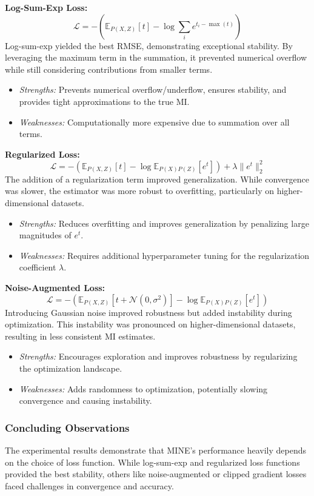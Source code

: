 \documentclass[lettersize,journal]{IEEEtran}
\begin{document}
    \textbf{Log-Sum-Exp Loss:} 
  $$\mathcal{L} = - \left( \mathbb{E}_{P(X, Z)}[t] - \log \sum_{i} e^{t_i - \max(t)} \right)$$
  Log-sum-exp yielded the best RMSE, demonstrating exceptional stability. By leveraging the maximum term in the summation, it prevented numerical overflow while still considering contributions from smaller terms.
    \begin{itemize}
        \item \textit{Strengths:} Prevents numerical overflow/underflow, ensures stability, and provides tight approximations to the true MI.
        \item \textit{Weaknesses:} Computationally more expensive due to summation over all terms.
    \end{itemize}
    
    \textbf{Regularized Loss:} 
  $$\mathcal{L} = - \left( \mathbb{E}_{P(X, Z)}[t] - \log \mathbb{E}_{P(X)P(Z)}[e^t] \right) + \lambda \|e^t\|_2^2$$
  The addition of a regularization term improved generalization. While convergence was slower, the estimator was more robust to overfitting, particularly on higher-dimensional datasets.
    \begin{itemize}
        \item \textit{Strengths:} Reduces overfitting and improves generalization by penalizing large magnitudes of \( e^t \).
        \item \textit{Weaknesses:} Requires additional hyperparameter tuning for the regularization coefficient \( \lambda \).
    \end{itemize}
    
    \textbf{Noise-Augmented Loss:} 
  $$\mathcal {L} = - \left( \mathbb{E}_{P(X, Z)}[t + \mathcal{N}(0, \sigma^2)] - \log \mathbb{E}_{P(X)P(Z)}[e^t] \right)$$
  Introducing Gaussian noise improved robustness but added instability during optimization. This instability was pronounced on higher-dimensional datasets, resulting in less consistent MI estimates.
    \begin{itemize}
        \item \textit{Strengths:} Encourages exploration and improves robustness by regularizing the optimization landscape.
        \item \textit{Weaknesses:} Adds randomness to optimization, potentially slowing convergence and causing instability.
    \end{itemize}

\subsubsection{Concluding Observations}
The experimental results demonstrate that MINE's performance heavily depends on the choice of loss function. While log-sum-exp and regularized loss functions provided the best stability, others like noise-augmented or clipped gradient losses faced challenges in convergence and accuracy.
\end{document}
